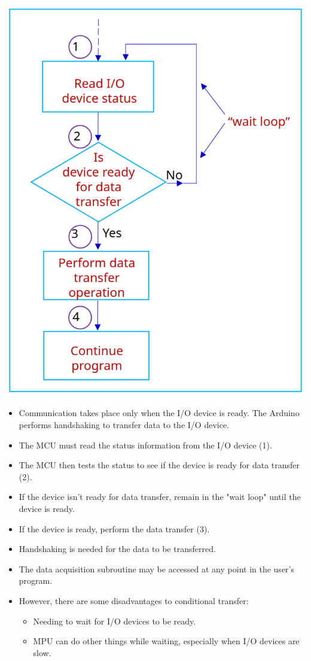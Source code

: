 \documentclass[11pt]{article}
\begin{document}
\begin{center}
\includegraphics[scale=0.55]{./images/conditional-transfer-process-diagram.png}
\end{center}
\begin{itemize}
\item Communication takes place only when the I/O device is ready. The Arduino performs handshaking to transfer data to the I/O device.
\item The MCU must read the status information from the I/O device (1).
\item The MCU then tests the status to see if the device is ready for data transfer (2).
\item If the device isn't ready for data transfer, remain in the "wait loop" until the device is ready.
\item If the device is ready, perform the data transfer (3).
\item Handshaking is needed for the data to be transferred.
\item The data acquisition subroutine may be accessed at any point in the user's program.
\item However, there are some disadvantages to conditional transfer:
\begin{itemize}
\item Needing to wait for I/O devices to be ready.
\item MPU can do other things while waiting, especially when I/O devices are slow.
\end{itemize}
\end{itemize}
\end{document}
